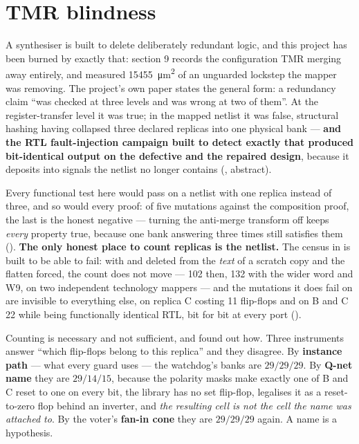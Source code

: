 \section{TMR blindness}
\label{sec:harden-blind}

A synthesiser is built to delete deliberately redundant logic, and this
project has been burned by exactly that:  section 9
records the configuration TMR merging away entirely, and 
measured \SI{15455}{\micro\meter\squared} of an unguarded lockstep the
mapper was removing. The project's own paper states the general form: a
redundancy claim ``was checked at three levels and was wrong at two of
them''. At the register-transfer level it was true; in the mapped
netlist it was false, structural hashing having collapsed three declared
replicas into one physical bank --- \textbf{and the RTL fault-injection
campaign built to detect exactly that produced bit-identical output on
the defective and the repaired design}, because it deposits into signals
the netlist no longer contains (, abstract).

Every functional test here would pass on a netlist with one replica
instead of three, and so would every proof: of five mutations against
the composition proof, the last is the honest negative --- turning the
anti-merge transform off keeps \emph{every} property true, because one
bank answering three times still satisfies them
(). \textbf{The only honest place to count
replicas is the netlist.} The census in
 is built to be able to
fail: with  and  deleted from the
\emph{text} of a scratch copy and the flatten forced, the count does not
move --- 102 then, 132 with the wider word and W9, on two independent
technology mappers --- and the mutations it does fail on are invisible
to everything else,  on replica C costing 11 flip-flops
and on B and C 22 while being functionally identical RTL, bit for bit at
every port ().

Counting is necessary and not sufficient, and  found out how.
Three instruments answer ``which flip-flops belong to this replica'' and
they disagree. By \textbf{instance path} --- what every guard uses ---
the watchdog's banks are $29/29/29$. By \textbf{Q-net name} they are
$29/14/15$, because the polarity masks make exactly one of B and C reset
to one on every bit, the library has no set flip-flop, 
legalises it as a reset-to-zero flop behind an inverter, and \emph{the
resulting cell is not the cell the name was attached to}. By the voter's
\textbf{fan-in cone} they are $29/29/29$ again. A name is a hypothesis.

